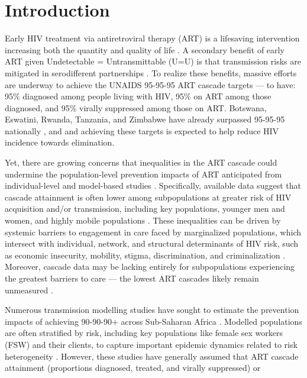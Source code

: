 \section{Introduction}\label{art.intro}
Early HIV treatment via antiretroviral therapy (ART) is a lifesaving intervention
increasing both the quantity and quality of life \cite{Lundgren2015init}.
A secondary benefit of early ART given Undetectable = Untransmittable (U=U) is that
transmission risks are mitigated in serodifferent partnerships \cite{Cohen2016}.
To realize these benefits, massive efforts are underway to achieve
the UNAIDS 95-95-95 ART cascade targets \cite{UNAIDS2023} --- \ie to have:
95\% diagnosed among people living with HIV,
95\% on ART among those diagnosed, and
95\% virally suppressed among those on ART.
Botswana, Eswatini, Rwanda, Tanzania, and Zimbabwe
have already surpassed 95-95-95 nationally \cite{UNAIDS2023}, and
and achieving these targets is expected to help reduce HIV incidence towards elimination.
\par
Yet, there are growing concerns that inequalities in the ART cascade
could undermine the population-level prevention impacts of ART
anticipated from individual-level and model-based studies
\cite{Baral2019,Green2020,Maheu-Giroux2024}.
Specifically, available data suggest that cascade attainment is often lower
among subpopulations at greater risk of HIV acquisition and/or transmission,
including key populations, younger men and women, and highly mobile populations
\cite{Hakim2018,Green2020}.
These inequalities can be driven by
systemic barriers to engagement in care faced by marginalized populations,
which intersect with individual, network, and structural determinants of HIV risk,
such as economic insecurity, mobility, stigma, discrimination, and criminalization
\cite{Lancaster2016sr,Wanyenze2016,Schwartz2017,Schmidt-Sane2022}.
Moreover, cascade data may be lacking entirely
for subpopulations experiencing the greatest barriers to care
--- \ie the lowest ART cascades likely remain unmeasured \cite{Hakim2018}.
\par
Numerous transmission modelling studies have sought to estimate
the prevention impacts of achieving 90-90-90+ across Sub-Saharan Africa \cite{Knight2022sr}.
Modelled populations are often stratified by risk,
including key populations like female sex workers (FSW) and their clients,
to capture important epidemic dynamics related to risk heterogeneity \cite{Watts2010}.
However, these studies have generally assumed that ART cascade
attainment (\ie proportions diagnosed, treated, and virally suppressed) or
